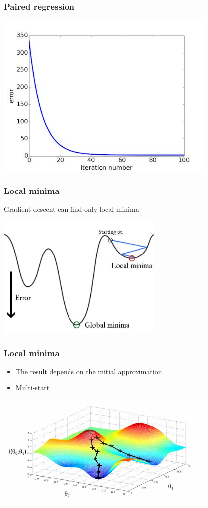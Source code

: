 \documentclass[default]{beamer}
\begin{document}
	\begin{frame}	
\frametitle{Paired regression}

\centering
\includegraphics[width=0.8\textwidth]{linear_28.jpg}
\end{frame}

	\begin{frame}	
\frametitle{Local minima}

\Large
Gradient descent can find only local minima

\centering
\includegraphics[width=0.6\textwidth]{linear_29.jpg}
\end{frame}

	\begin{frame}	
\frametitle{Local minima}

\Large
\begin{itemize}
	\item The result depends on the initial approximation
	\item Multi-start
	
\end{itemize}

\centering
\includegraphics[width=0.8\textwidth]{linear_30.jpg}
\end{frame}
\end{document}

